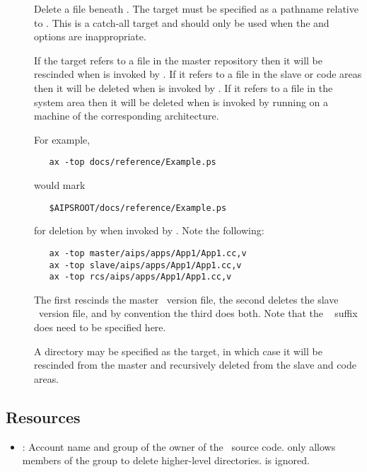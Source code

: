 \begin{description}
\item[]
   Delete a file beneath .  The target must be specified as a
   pathname relative to .  This is a catch-all target and
   should only be used when the  and  options are
   inappropriate.

   If the target refers to a file in the master repository then it will be
   rescinded when  is invoked by .  If it refers to a
   file in the slave or code areas then it will be deleted when
    is invoked by .  If it refers to a file in
   the system area then it will be deleted when  is invoked by
    running on a machine of the corresponding architecture.

   For example,

\begin{verbatim}
   ax -top docs/reference/Example.ps
\end{verbatim}

   \noindent
   would mark

\begin{verbatim}
   $AIPSROOT/docs/reference/Example.ps
\end{verbatim}

   \noindent
   for deletion by  when invoked by .  Note the
   following:

\begin{verbatim}
   ax -top master/aips/apps/App1/App1.cc,v
   ax -top slave/aips/apps/App1/App1.cc,v
   ax -top rcs/aips/apps/App1/App1.cc,v
\end{verbatim}

   \noindent
   The first rescinds the master \rcs\ version file, the second deletes the
   slave \rcs\ version file, and by convention the third does both.  Note
   that the \rcs\  suffix does need to be specified here.

   \noindent
   A directory may be specified as the target, in which case it will be
   rescinded from the master and recursively deleted from the slave and code
   areas.
\end{description}

\subsection*{Resources}

\begin{itemize}
\item
   : Account name and group of the owner of the
   \aipspp\ source code.   only allows members of the 
   group to delete higher-level directories.   is
   ignored.
\end{itemize}

